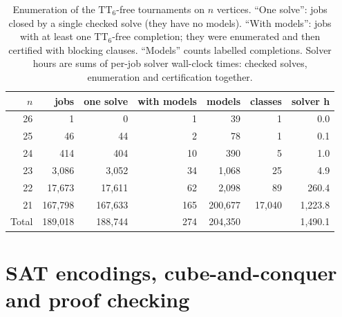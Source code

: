\documentclass[11pt]{amsart}
\theoremstyle{definition}
\theoremstyle{remark}
\newcommand{\TT}[1]{\mathrm{TT}_{#1}}
\begin{document}
\begin{table}[ht]
\centering\small
\caption{Enumeration of the $\TT{6}$-free tournaments on $n$ vertices.
``One solve'': jobs closed by a single checked solve (they have no models).
``With models'': jobs with at least one $\TT{6}$-free completion; they were
enumerated and then certified with blocking clauses. ``Models'' counts
labelled completions. Solver hours are sums of per-job solver wall-clock
times: checked solves, enumeration and certification together.}
\label{tab:cat}
\begin{tabular}{@{}rrrrrrr@{}}
\toprule
$n$ & jobs & one solve & with models & models & classes & solver h \\
\midrule
26 & 1 & 0 & 1 & 39 & 1 & 0.0 \\
25 & 46 & 44 & 2 & 78 & 1 & 0.1 \\
24 & 414 & 404 & 10 & 390 & 5 & 1.0 \\
23 & 3{,}086 & 3{,}052 & 34 & 1{,}068 & 25 & 4.9 \\
22 & 17{,}673 & 17{,}611 & 62 & 2{,}098 & 89 & 260.4 \\
21 & 167{,}798 & 167{,}633 & 165 & 200{,}677 & 17{,}040 & 1{,}223.8 \\
\midrule
Total & 189{,}018 & 188{,}744 & 274 & 204{,}350 & & 1{,}490.1 \\
\bottomrule
\end{tabular}
\end{table}

\section{SAT encodings, cube-and-conquer and proof checking}\label{sec:sat}
\end{document}
